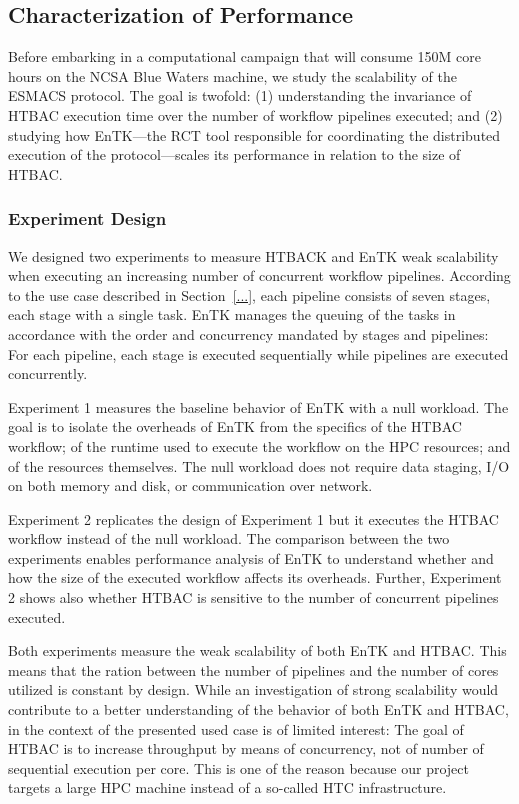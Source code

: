 \subsection{Characterization of Performance}

Before embarking in a computational campaign that will consume 150M core
hours on the NCSA Blue Waters machine, we study the scalability of the ESMACS
protocol. The goal is twofold: (1) understanding the invariance of HTBAC
execution time over the number of workflow pipelines executed; and (2)
studying how EnTK---the RCT tool responsible for coordinating the distributed
execution of the protocol---scales its performance in relation to the size of
HTBAC\@.


\subsubsection{Experiment Design}

We designed two experiments to measure HTBACK and EnTK weak scalability when
executing an increasing number of concurrent workflow pipelines. According to
the use case described in Section~\ref{...}, each pipeline consists of seven
stages, each stage with a single task. EnTK manages the queuing of the tasks
in accordance with the order and concurrency mandated by stages and
pipelines: For each pipeline, each stage is executed sequentially while
pipelines are executed concurrently.

Experiment 1 measures the baseline behavior of EnTK with a null workload. The
goal is to isolate the overheads of EnTK from the specifics of the HTBAC
workflow; of the runtime used to execute the workflow on the HPC resources;
and of the resources themselves. The null workload does not require data
staging, I/O on both memory and disk, or communication over network.

Experiment 2 replicates the design of Experiment 1 but it executes the HTBAC
workflow instead of the null workload. The comparison between the two
experiments enables performance analysis of EnTK to understand whether and
how the size of the executed workflow affects its overheads. Further,
Experiment 2 shows also whether HTBAC is sensitive to the number of
concurrent pipelines executed.

Both experiments measure the weak scalability of both EnTK and HTBAC\@. This
means that the ration between the number of pipelines and the number of cores
utilized is constant by design. While an investigation of strong scalability
would contribute to a better understanding of the behavior of both EnTK and
HTBAC, in the context of the presented used case is of limited interest: The
goal of HTBAC is to increase throughput by means of concurrency, not of
number of sequential execution per core. This is one of the reason because
our project targets a large HPC machine instead of a so-called HTC
infrastructure.

